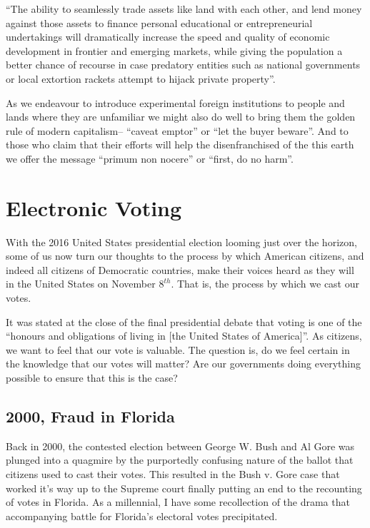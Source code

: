 ``The ability to seamlessly trade assets like land with each other, and lend money against those assets to finance personal educational or entrepreneurial undertakings will dramatically increase the speed and quality of economic development in frontier and emerging markets, while giving the population a better chance of recourse in case predatory entities such as national governments or local extortion rackets attempt to hijack private property''.

As we endeavour to introduce experimental foreign institutions to people and lands where they are unfamiliar we might also do well to bring them the golden rule of modern capitalism-- ``caveat emptor'' or ``let the buyer beware''. And to those who claim that their efforts will help the disenfranchised of the this earth we offer the message ``primum non nocere'' or ``first, do no harm''.

\section{Electronic Voting}

With the 2016 United States presidential election looming just over the horizon, some of us now turn our thoughts to the process by which American citizens, and indeed all citizens of Democratic countries, make their voices heard as they will in the United States on November $8^{th}$. 
That is, the process by which we cast our votes.

It was stated at the close of the final presidential debate that voting is one of the ``honours and obligations of living in [the United States of America]''.
As citizens, we want to feel that our vote is valuable. 
The question is, do we feel certain in the knowledge that our votes will matter? 
Are our governments doing everything possible to ensure that this is the case?    

\subsection*{2000, Fraud in Florida}

Back in 2000, the contested election between George W. Bush and Al Gore was plunged into a quagmire by the purportedly confusing nature of the ballot that citizens used to cast their votes. This resulted in the Bush v. Gore case that worked it's way up to the Supreme court finally putting an end to the recounting of votes in Florida. 
As a millennial, I have some recollection of the drama that accompanying battle for Florida's electoral votes precipitated.

